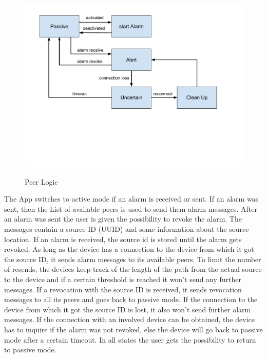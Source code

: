 \documentclass{report}
\newcommand{\lfig}[1]{\label{fig:#1}}
\begin{document}
\begin{figure}[h]
	\centering
    \includegraphics[width=\columnwidth]{peerControll.pdf}
    \lfig{peer-logic}
    \vspace{-5mm} %
	\caption{Peer Logic}
\end{figure}

The App switches to active mode if an alarm is received or sent. If an alarm was sent, then the List of available peers is used to send them alarm messages. After an alarm was sent the user is given the possibility to revoke the alarm. The messages contain a source ID (UUID) and some information about the source location. If an alarm is received, the source id is stored until the alarm gets revoked. As long as the device has a connection to the device from which it got the source ID, it sends alarm messages to its available peers. To limit the number of resends, the devices keep track of the length of the path from the actual source to the device and if a certain threshold is reached it won't send any further messages. If a revocation with the source ID is received, it sends revocation messages to all its peers and goes back to passive mode. If the connection to the device from which it got the source ID is lost, it also won't send further alarm messages. If the connection with an involved device can be obtained, the device has to inquire if the alarm was not revoked, else the device will go back to passive mode after a certain timeout. In all states the user gets the possibility to return to passive mode.
\end{document}
